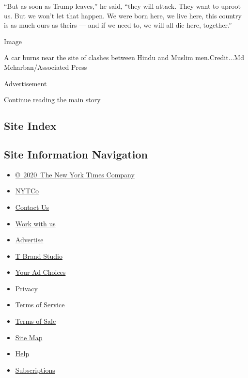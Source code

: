 ``But as soon as Trump leaves,'' he said, ``they will attack. They want
to uproot us. But we won't let that happen. We were born here, we live
here, this country is as much ours as theirs --- and if we need to, we
will all die here, together.''

Image

A car burns near the site of clashes between Hindu and Muslim
men.Credit...Md Meharban/Associated Press

Advertisement

\protect\hyperlink{after-bottom}{Continue reading the main story}

\hypertarget{site-index}{%
\subsection{Site Index}\label{site-index}}

\hypertarget{site-information-navigation}{%
\subsection{Site Information
Navigation}\label{site-information-navigation}}

\begin{itemize}
\tightlist
\item
  \href{https://help.nytimes.com/hc/en-us/articles/115014792127-Copyright-notice}{©~2020~The
  New York Times Company}
\end{itemize}

\begin{itemize}
\tightlist
\item
  \href{https://www.nytco.com/}{NYTCo}
\item
  \href{https://help.nytimes.com/hc/en-us/articles/115015385887-Contact-Us}{Contact
  Us}
\item
  \href{https://www.nytco.com/careers/}{Work with us}
\item
  \href{https://nytmediakit.com/}{Advertise}
\item
  \href{http://www.tbrandstudio.com/}{T Brand Studio}
\item
  \href{https://www.nytimes.com/privacy/cookie-policy\#how-do-i-manage-trackers}{Your
  Ad Choices}
\item
  \href{https://www.nytimes.com/privacy}{Privacy}
\item
  \href{https://help.nytimes.com/hc/en-us/articles/115014893428-Terms-of-service}{Terms
  of Service}
\item
  \href{https://help.nytimes.com/hc/en-us/articles/115014893968-Terms-of-sale}{Terms
  of Sale}
\item
  \href{https://spiderbites.nytimes.com}{Site Map}
\item
  \href{https://help.nytimes.com/hc/en-us}{Help}
\item
  \href{https://www.nytimes.com/subscription?campaignId=37WXW}{Subscriptions}
\end{itemize}

